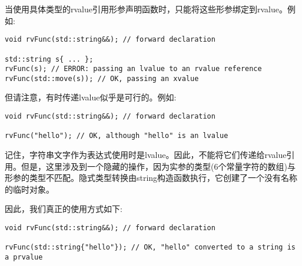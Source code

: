 当使用具体类型的rvalue引用形参声明函数时，只能将这些形参绑定到rvalue。例如:\par

\begin{lstlisting}[caption={}]
void rvFunc(std::string&&); // forward declaration

std::string s{ ... };
rvFunc(s); // ERROR: passing an lvalue to an rvalue reference
rvFunc(std::move(s)); // OK, passing an xvalue
\end{lstlisting}

但请注意，有时传递lvalue似乎是可行的。例如:\par

\begin{lstlisting}[caption={}]
void rvFunc(std::string&&); // forward declaration

rvFunc("hello"); // OK, although "hello" is an lvalue
\end{lstlisting}

记住，字符串文字作为表达式使用时是lvalue。因此，不能将它们传递给rvalue引用。但是，这里涉及到一个隐藏的操作，因为实参的类型(6个常量字符的数组)与形参的类型不匹配。隐式类型转换由string构造函数执行，它创建了一个没有名称的临时对象。\par

因此，我们真正的使用方式如下:\par

\begin{lstlisting}[caption={}]
void rvFunc(std::string&&); // forward declaration

rvFunc(std::string{"hello"}); // OK, "hello" converted to a string is a prvalue
\end{lstlisting}






























































